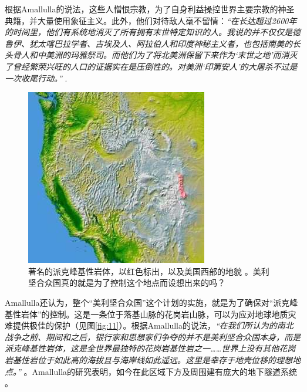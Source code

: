 \documentclass[10pt,twocolumn,letterpaper]{article}
\begin{document}
根据Amallulla的说法，这些人憎恨宗教，为了自身利益操控世界主要宗教的神圣典籍，并大量使用象征主义。此外，他们对待敌人毫不留情：\textit{“在长达超过2600年的时间里，他们有系统地消灭了所有拥有末世特定知识的人。我说的并不仅仅是德鲁伊、犹太喀巴拉学者、古埃及人、阿拉伯人和印度神秘主义者，也包括南美的长头骨人和中美洲的玛雅祭司。而他们为了将北美洲保留下来作为‘末世之地’而消灭了曾经繁荣兴旺的人口的证据实在是压倒性的。对美洲‘印第安人’的大屠杀不过是一次收尾行动。”} \cite{33,34}.

\begin{figure}[t]
\begin{center}
   \includegraphics[width=1\linewidth]{pike.jpg}
\end{center}
   \caption{著名的派克峰基性岩体，以红色标出，以及美国西部的地貌 \cite{36}。美利坚合众国真的就是为了控制这个地点而设想出来的吗？}
\label{fig:11}
\label{fig:onecol}
\end{figure}

Amallulla还认为，整个“美利坚合众国”这个计划的实施，就是为了确保对“派克峰基性岩体”的控制。这是一条位于落基山脉的花岗岩山脉，可以为应对地球地质灾难提供极佳的保护（见图\ref{fig:11}）。根据Amallulla的说法，\textit{“在我们所认为的南北战争之前、期间和之后，银行家和思想家们争夺的并不是美利坚合众国本身，而是派克峰基性岩体，这是全世界最独特的花岗岩基性岩之一……世界上没有其他花岗岩基性岩位于如此高的海拔且与海岸线如此遥远。这里是幸存于地壳位移的理想地点。”} \cite{33,34}。Amallulla的研究表明，如今在此区域下方及周围建有庞大的地下隧道系统 \cite{36}。
\end{document}
